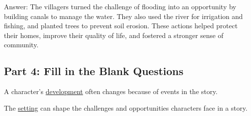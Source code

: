 \documentclass[12pt]{article}
\begin{document}
Answer: The villagers turned the challenge of flooding into an opportunity by building canals to manage the water. They also used the river for irrigation and fishing, and planted trees to prevent soil erosion. These actions helped protect their homes, improve their quality of life, and fostered a stronger sense of community.

\subsection*{Part 4: Fill in the Blank Questions}

A character’s \underline{development} often changes because of events in the story.

The \underline{setting} can shape the challenges and opportunities characters face in a story.
\end{document}
